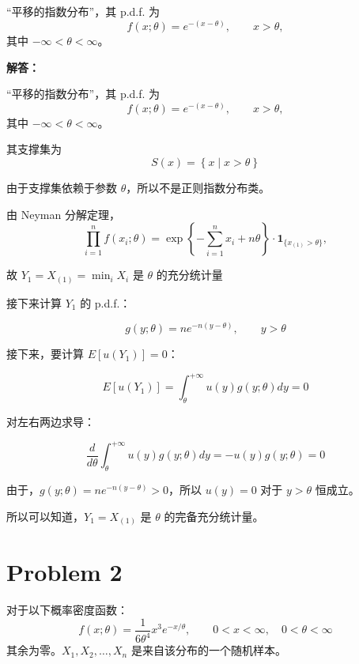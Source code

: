 \documentclass[12pt,a4paper]{article}
\begin{document}
\subsection{} 
 
“平移的指数分布”，其 p.d.f. 为
    \[
        f(x;\theta)=e^{-(x-\theta)},\qquad x>\theta,
    \]
    其中 $-\infty<\theta<\infty$。

\begin{answerbox}
\textbf{解答：}

“平移的指数分布”，其 p.d.f. 为
    \[
        f(x;\theta)=e^{-(x-\theta)},\qquad x>\theta,
    \]
    其中 $-\infty<\theta<\infty$。

其支撑集为
$$
S(x) = \left\{x \mid x > \theta\right\}
$$

由于支撑集依赖于参数 $\theta$，所以不是正则指数分布类。

由 Neyman 分解定理，
$$
\prod_{i=1}^{n} f(x_i;\theta) = \exp\left\{-\sum_{i=1}^{n} x_i + n\theta\right\}\cdot \mathbf{1}_{\{x_{(1)} > \theta\}},
$$

故 $Y_1 = X_{(1)} = \min_i X_i$ 是 $\theta$ 的充分统计量

接下来计算 $Y_1$ 的 p.d.f.：

$$
g(y;\theta) = ne^{-n(y-\theta)},\qquad y>\theta
$$

接下来，要计算 $E\left[u(Y_1)\right] = 0$：

$$
E\left[u(Y_1)\right] = \int_{\theta}^{+\infty} u(y) g(y;\theta) dy = 0
$$

对左右两边求导：

$$
\frac{d}{d\theta} \int_{\theta}^{+\infty} u(y) g(y;\theta) dy = -u(y) g(y;\theta) = 0
$$

由于，$g(y;\theta) = ne^{-n(y-\theta)} > 0$，所以 $u(y) = 0$ 对于 $y>\theta$ 恒成立。

所以可以知道，$Y_1 = X_{(1)}$ 是 $\theta$ 的完备充分统计量。
\end{answerbox}

\section{Problem 2}

对于以下概率密度函数：
\[
    f(x;\theta)=\frac{1}{6\theta^4}x^3e^{-x/\theta},\qquad
    0<x<\infty,\quad 0<\theta<\infty
\]
其余为零。$X_1,X_2,\ldots,X_n$ 是来自该分布的一个随机样本。

\subsection{}
\end{document}
